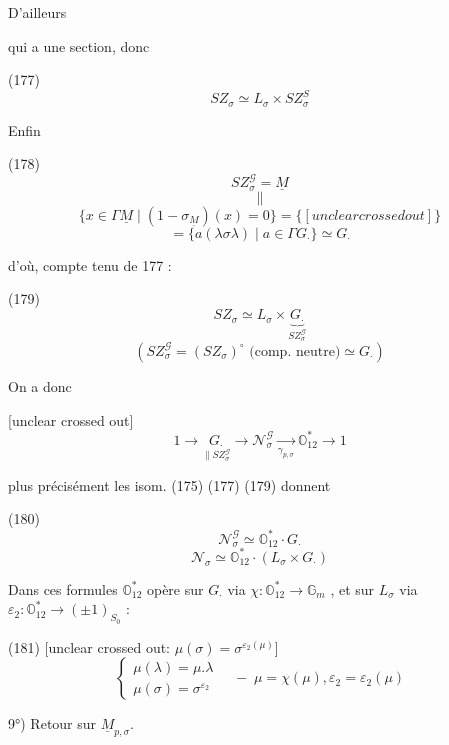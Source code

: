 D'ailleurs
qui a une section, donc

(177) $$ S Z_{\sigma} \simeq L_{\sigma} \times S Z_{\sigma}^S $$

\newpage


Enfin

(178)
$$S Z_{\sigma}^{\mathcal{G}} = \underline{M}$$
$$\parallel$$
$$\{ x \in \Gamma \underline{M} \mid (1 - \sigma_{\underline{M}})(x) = 0 \} = \{ [unclear crossed out] \}$$
$$= \{ a (\lambda \sigma \lambda) \mid a \in \Gamma G_{\cdot} \} \simeq G_{\cdot}$$

d'où, compte tenu de 177 :

(179)
$$S Z_{\sigma} \simeq L_{\sigma} \times \underbrace{G_{\cdot}}_{S Z_{\sigma}^{\mathcal{G}}}$$
$$(S Z_{\sigma}^{\mathcal{G}} = (S Z_{\sigma})^{\circ} \text{ (comp. neutre)} \simeq G_{\cdot})$$

On a donc

[unclear crossed out]
$$1 \to \underset{\parallel S Z_{\sigma}^{\mathcal{G}}}{G_{\cdot}} \to \mathcal{N}_{\sigma}^{\mathcal{G}} \underset{\gamma_{p,\sigma}}{\to} \mathbb{O}_{12}^* \to 1$$

plus précisément les isom. (175) (177) (179) donnent

(180)
$$\mathcal{N}_{\sigma}^{\mathcal{G}} \simeq \mathbb{O}_{12}^* \cdot G_{\cdot}$$
$$\mathcal{N}_{\sigma} \simeq \mathbb{O}_{12}^* \cdot (L_{\sigma} \times G_{\cdot})$$

Dans ces formules $\mathbb{O}_{12}^*$ opère sur $G_{\cdot}$ via $\chi : \mathbb{O}_{12}^* \to \mathbb{G}_m$ , et sur $L_{\sigma}$ via $\varepsilon_2 : \mathbb{O}_{12}^* \to (\pm 1)_{S_0}$ :

(181)
[unclear crossed out: $\mu(\sigma) = \sigma^{\varepsilon_2(\mu)}$]
$$\begin{cases} \mu(\lambda) = \mu . \lambda \\ \mu(\sigma) = \sigma^{\varepsilon_2} \end{cases} \quad - \; \mu = \chi(\mu) , \varepsilon_2 = \varepsilon_2(\mu)$$

\newpage


9°) Retour sur $\underline{M}_{p,\sigma}$.

